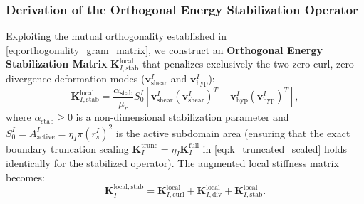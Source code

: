 \documentclass[VANCOUVER,Times1COL]{WileyNJD-v5}
\begin{document}
\subsubsection{Derivation of the Orthogonal Energy Stabilization Operator}
\label{subsubsec:derivation_orthogonal_stabilization}

Exploiting the mutual orthogonality established in \eqref{eq:orthogonality_gram_matrix}, we construct an \textbf{Orthogonal Energy Stabilization Matrix} $\mathbf{K}_{I, \mathrm{stab}}^{\mathrm{local}}$ that penalizes exclusively the two zero-curl, zero-divergence deformation modes ($\mathbf{v}_{\mathrm{shear}}^I$ and $\mathbf{v}_{\mathrm{hyp}}^I$):
\begin{equation}
    \mathbf{K}_{I, \mathrm{stab}}^{\mathrm{local}} = \frac{\alpha_{\mathrm{stab}}}{\mu_r} S_0^I \left[ \mathbf{v}_{\mathrm{shear}}^I (\mathbf{v}_{\mathrm{shear}}^I)^T + \mathbf{v}_{\mathrm{hyp}}^I (\mathbf{v}_{\mathrm{hyp}}^I)^T \right],
    \label{eq:k_stab_analytic}
\end{equation}
where $\alpha_{\mathrm{stab}} \ge 0$ is a non-dimensional stabilization parameter and $S_0^I = A_{\mathrm{active}}^I = \eta_I \pi (r_s^I)^2$ is the active subdomain area (ensuring that the exact boundary truncation scaling $\mathbf{K}_I^{\mathrm{trunc}} = \eta_I \mathbf{K}_I^{\mathrm{full}}$ in \eqref{eq:k_truncated_scaled} holds identically for the stabilized operator). The augmented local stiffness matrix becomes:
\begin{equation}
    \mathbf{K}_I^{\mathrm{local, stab}} = \mathbf{K}_{I, \mathrm{curl}}^{\mathrm{local}} + \mathbf{K}_{I, \mathrm{div}}^{\mathrm{local}} + \mathbf{K}_{I, \mathrm{stab}}^{\mathrm{local}}.
    \label{eq:k_augmented_local}
\end{equation}
\end{document}
